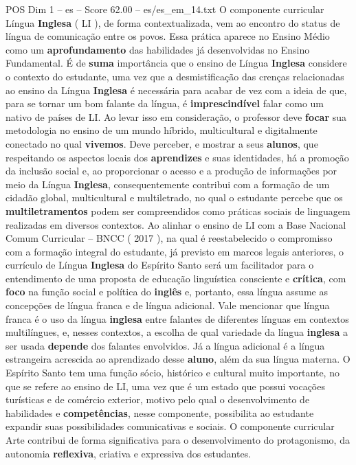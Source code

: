 \begin{textsample}{POS Dim 1 – es – Score 62.00 – es/es\_em\_14.txt}
O componente curricular Língua \textbf{Inglesa} ( LI ), de forma contextualizada, vem ao encontro do status de língua de comunicação entre os povos.
Essa prática aparece no Ensino Médio como um \textbf{aprofundamento} das habilidades já desenvolvidas no Ensino Fundamental.
É de \textbf{suma} importância que o ensino de Língua \textbf{Inglesa} considere o contexto do estudante, uma vez que a desmistificação das crenças relacionadas ao ensino da Língua \textbf{Inglesa} é necessária para acabar de vez com a ideia de que, para se tornar um bom falante da língua, é \textbf{imprescindível} falar como um nativo de países de LI.
Ao levar isso em consideração, o professor deve \textbf{focar} sua metodologia no ensino de um mundo híbrido, multicultural e digitalmente conectado no qual \textbf{vivemos}.
Deve perceber, e mostrar a seus \textbf{alunos}, que respeitando os aspectos locais dos \textbf{aprendizes} e suas identidades, há a promoção da inclusão social e, ao proporcionar o acesso e a produção de informações por meio da Língua \textbf{Inglesa}, consequentemente contribui com a formação de um cidadão global, multicultural e multiletrado, no qual o estudante percebe que os \textbf{multiletramentos} podem ser compreendidos como práticas sociais de linguagem realizadas em diversos contextos.
Ao alinhar o ensino de LI com a Base Nacional Comum Curricular – BNCC ( 2017 ), na qual é reestabelecido o compromisso com a formação integral do estudante, já previsto em marcos legais anteriores, o currículo de Língua \textbf{Inglesa} do Espírito Santo será um facilitador para o entendimento de uma proposta de educação linguística consciente e \textbf{crítica}, com \textbf{foco} na função social e política do \textbf{inglês} e, portanto, essa língua assume as concepções de língua franca e de língua adicional.
Vale mencionar que língua franca é o uso da língua \textbf{inglesa} entre falantes de diferentes línguas em contextos multilíngues, e, nesses contextos, a escolha de qual variedade da língua \textbf{inglesa} a ser usada \textbf{depende} dos falantes envolvidos.
Já a língua adicional é a língua estrangeira acrescida ao aprendizado desse \textbf{aluno}, além da sua língua materna.
O Espírito Santo tem uma função sócio, histórico e cultural muito importante, no que se refere ao ensino de LI, uma vez que é um estado que possui vocações turísticas e de comércio exterior, motivo pelo qual o desenvolvimento de habilidades e \textbf{competências}, nesse componente, possibilita ao estudante expandir suas possibilidades comunicativas e sociais.
O componente curricular Arte contribui de forma significativa para o desenvolvimento do protagonismo, da autonomia \textbf{reflexiva}, criativa e expressiva dos estudantes.

\end{textsample}
